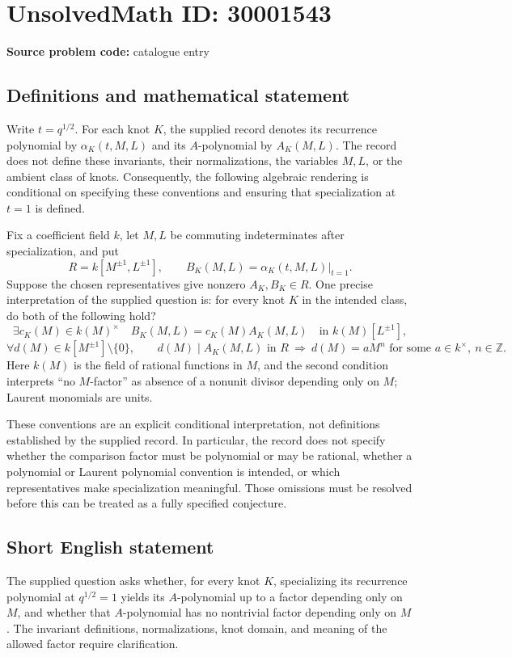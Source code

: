 \documentclass[11pt]{article}
\newcommand{\Z}{\mathbb{Z}}
\begin{document}
\section*{UnsolvedMath ID: 30001543}
\textbf{Source problem code:} catalogue entry
\subsection{Definitions and mathematical statement}
Write \(t=q^{1/2}\). For each knot \(K\), the supplied record denotes its recurrence polynomial by \(\alpha_K(t,M,L)\) and its \(A\)-polynomial by \(A_K(M,L)\). The record does not define these invariants, their normalizations, the variables \(M,L\), or the ambient class of knots. Consequently, the following algebraic rendering is conditional on specifying these conventions and ensuring that specialization at \(t=1\) is defined.

Fix a coefficient field \(k\), let \(M,L\) be commuting indeterminates after specialization, and put
\[
R=k[M^{\pm1},L^{\pm1}],\qquad B_K(M,L)=\left.\alpha_K(t,M,L)\right|_{t=1}.
\]
Suppose the chosen representatives give nonzero \(A_K,B_K\in R\). One precise interpretation of the supplied question is: for every knot \(K\) in the intended class, do both of the following hold?
\[
\exists c_K(M)\in k(M)^{\times}\quad B_K(M,L)=c_K(M)A_K(M,L)
\quad\text{in }k(M)[L^{\pm1}],
\]
\[
\forall d(M)\in k[M^{\pm1}]\setminus\{0\},\qquad
 d(M)\mid A_K(M,L)\text{ in }R
 \ \Longrightarrow\ 
 d(M)=aM^n\text{ for some }a\in k^{\times},\ n\in\Z.
\]
Here \(k(M)\) is the field of rational functions in \(M\), and the second condition interprets ``no \(M\)-factor'' as absence of a nonunit divisor depending only on \(M\); Laurent monomials are units.

These conventions are an explicit conditional interpretation, not definitions established by the supplied record. In particular, the record does not specify whether the comparison factor must be polynomial or may be rational, whether a polynomial or Laurent polynomial convention is intended, or which representatives make specialization meaningful. Those omissions must be resolved before this can be treated as a fully specified conjecture.
\subsection{Short English statement}
The supplied question asks whether, for every knot \(K\), specializing its recurrence polynomial at \(q^{1/2}=1\) yields its \(A\)-polynomial up to a factor depending only on \(M\), and whether that \(A\)-polynomial has no nontrivial factor depending only on \(M\). The invariant definitions, normalizations, knot domain, and meaning of the allowed factor require clarification.
\end{document}
